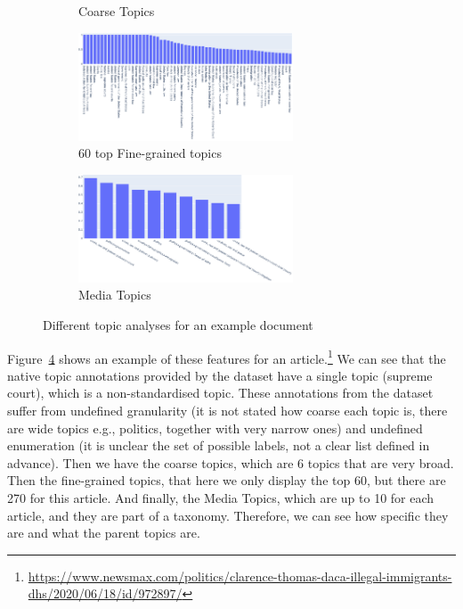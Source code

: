 \begin{figure}
\begin{subfigure}{0.45\textwidth}
		\caption{Coarse Topics} %
            \label{fig:topic_analysis_different_tools_coarse} 
	\end{subfigure}
	\begin{subfigure}{\textwidth} %
		\centering\includegraphics[width=0.7\textwidth]{figures/finegrained_topics.pdf}
		\caption{60 top Fine-grained topics} %
            \label{fig:topic_analysis_different_tools_fine} 
	\end{subfigure}
	\begin{subfigure}{\textwidth} %
		\centering\includegraphics[width=0.7\textwidth]{figures/mediatopics.pdf}
		\caption{Media Topics} %
            \label{fig:topic_analysis_different_tools_mediatopics} 
	\end{subfigure}
    \caption{Different topic analyses for an example document}
    \label{fig:topic_analysis_different_tools} 
\end{figure}

Figure~\ref{fig:topic_analysis_different_tools} shows an example of these features for an article.\footnote{\url{https://www.newsmax.com/politics/clarence-thomas-daca-illegal-immigrants-dhs/2020/06/18/id/972897/}} We can see that the native topic annotations provided by the dataset have a single topic (supreme court), which is a non-standardised topic. These annotations from the dataset suffer from undefined granularity (it is not stated how coarse each topic is, there are wide topics e.g., politics, together with very narrow ones) and undefined enumeration (it is unclear the set of possible labels, not a clear list defined in advance).
Then we have the coarse topics, which are 6 topics that are very broad. Then the fine-grained topics, that here we only display the top 60, but there are 270 for this article.
And finally, the Media Topics, which are up to 10 for each article, and they are part of a taxonomy.  Therefore, we can see how specific they are and what the parent topics are.

